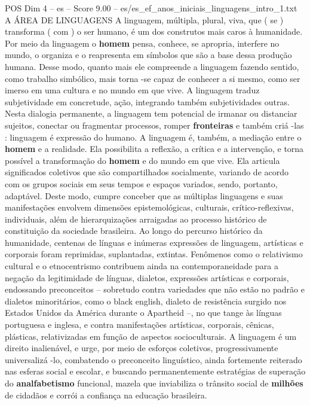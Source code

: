 \begin{textsample}{POS Dim 4 – es – Score 9.00 – es/es\_ef\_anos\_iniciais\_linguagens\_intro\_1.txt}  \label{ex:f4_pos_080}
A ÁREA DE LINGUAGENS A linguagem, múltipla, plural, viva, que ( se ) transforma ( com ) o ser humano, é um dos construtos mais caros à humanidade.
Por meio da linguagem o \textbf{homem} pensa, conhece, se apropria, interfere no mundo, o organiza e o reapresenta em símbolos que são a base dessa produção humana.
Desse modo, quanto mais ele compreende a linguagem fazendo sentido, como trabalho simbólico, mais torna -se capaz de conhecer a si mesmo, como ser imerso em uma cultura e no mundo em que vive.
A linguagem traduz subjetividade em concretude, ação, integrando também subjetividades outras.
Nesta dialogia permanente, a linguagem tem potencial de irmanar ou distanciar sujeitos, conectar ou fragmentar processos, romper \textbf{fronteiras} e também criá -las : linguagem é expressão do humano.
A linguagem é, também, a mediação entre o \textbf{homem} e a realidade.
Ela possibilita a reflexão, a crítica e a intervenção, e torna possível a transformação do \textbf{homem} e do mundo em que vive.
Ela articula significados coletivos que são compartilhados socialmente, variando de acordo com os grupos sociais em seus tempos e espaços variados, sendo, portanto, adaptável.
Deste modo, cumpre conceber que as múltiplas linguagens e suas manifestações envolvem dimensões epistemológicas, culturais, crítico-reflexivas, individuais, além de hierarquizações arraigadas ao processo histórico de constituição da sociedade brasileira.
Ao longo do percurso histórico da humanidade, centenas de línguas e inúmeras expressões de linguagem, artísticas e corporais foram reprimidas, suplantadas, extintas.
Fenômenos como o relativismo cultural e o etnocentrismo contribuem ainda na contemporaneidade para a negação da legitimidade de línguas, dialetos, expressões artísticas e corporais, endossando preconceitos – sobretudo contra variedades que não estão no padrão e dialetos minoritários, como o black english, dialeto de resistência surgido nos Estados Unidos da América durante o Apartheid –, no que tange às línguas portuguesa e inglesa, e contra manifestações artísticas, corporais, cênicas, plásticas, relativizadas em função de aspectos socioculturais.
A linguagem é um direito inalienável, e urge, por meio de esforços coletivos, progressivamente universalizá -lo, combatendo o preconceito linguístico, ainda fortemente reiterado nas esferas social e escolar, e buscando permanentemente estratégias de superação do \textbf{analfabetismo} funcional, mazela que inviabiliza o trânsito social de \textbf{milhões} de cidadãos e corrói a confiança na educação brasileira.

\end{textsample}
